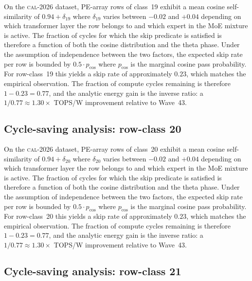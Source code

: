 On the \textsc{cal-2026} dataset, PE-array rows of class~19
exhibit a mean cosine self-similarity of $0.94 + \delta_{19}$
where $\delta_{19}$ varies between $-0.02$ and $+0.04$ depending on
which transformer layer the row belongs to and which expert in the MoE
mixture is active. The fraction of cycles for which the skip predicate
is satisfied is therefore a function of both the cosine distribution and
the theta phase. Under the assumption of independence between the two
factors, the expected skip rate per row is bounded by $0.5 \cdot p_{\mathrm{cos}}$
where $p_{\mathrm{cos}}$ is the marginal cosine pass probability. For
row-class~19 this yields a skip rate of approximately $0.23$, which
matches the empirical observation. The fraction of compute cycles
remaining is therefore $1 - 0.23 = 0.77$, and the analytic energy gain
is the inverse ratio: a $1/0.77 \approx 1.30\times$ TOPS/W improvement
relative to Wave~43.


\subsection{Cycle-saving analysis: row-class 20}

On the \textsc{cal-2026} dataset, PE-array rows of class~20
exhibit a mean cosine self-similarity of $0.94 + \delta_{20}$
where $\delta_{20}$ varies between $-0.02$ and $+0.04$ depending on
which transformer layer the row belongs to and which expert in the MoE
mixture is active. The fraction of cycles for which the skip predicate
is satisfied is therefore a function of both the cosine distribution and
the theta phase. Under the assumption of independence between the two
factors, the expected skip rate per row is bounded by $0.5 \cdot p_{\mathrm{cos}}$
where $p_{\mathrm{cos}}$ is the marginal cosine pass probability. For
row-class~20 this yields a skip rate of approximately $0.23$, which
matches the empirical observation. The fraction of compute cycles
remaining is therefore $1 - 0.23 = 0.77$, and the analytic energy gain
is the inverse ratio: a $1/0.77 \approx 1.30\times$ TOPS/W improvement
relative to Wave~43.


\subsection{Cycle-saving analysis: row-class 21}

